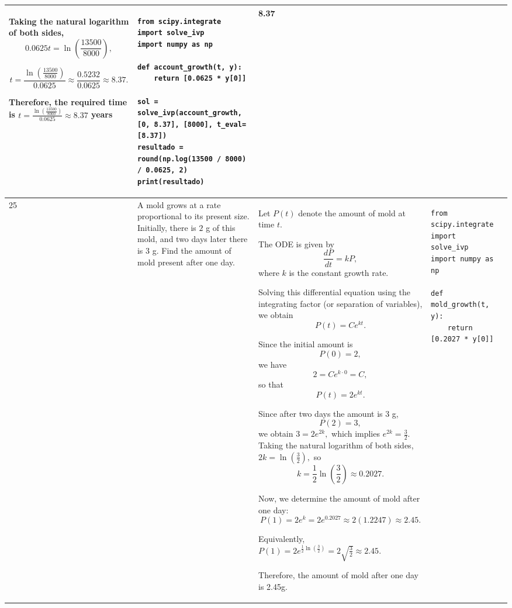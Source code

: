 \documentclass[a4paper,12pt]{article}
\begin{document}
\begin{longtable}{|p{0.3cm}|p{}|p{10cm}|p{}|p{1.5cm}|}
Taking the natural logarithm of both sides,
\[
0.0625t=\ln\left(\frac{13500}{8000}\right),
\]

\[
t=\frac{\ln\left(\frac{13500}{8000}\right)}{0.0625}
  \approx\frac{0.5232}{0.0625}
  \approx8.37.
\]

Therefore, the required time is
$ t=\frac{\ln\left(\frac{13500}{8000}\right)}{0.0625}\approx8.37$ years
& \begin{verbatim}
from scipy.integrate import solve_ivp
import numpy as np

def account_growth(t, y):
    return [0.0625 * y[0]]

sol = solve_ivp(account_growth, [0, 8.37], [8000], t_eval=[8.37])
resultado = round(np.log(13500 / 8000) / 0.0625, 2)
print(resultado) \end{verbatim}& 8.37   \\ \hline

25            &A mold grows at a rate proportional to its present size. Initially, there is \(2\) g of this mold, and two days later there is \(3\) g. Find the amount of mold present after one day.


              & Let \(P(t)\) denote the amount of mold at time \(t\).

The ODE is given by
\[
\frac{dP}{dt}=kP,
\]
where \(k\) is the constant growth rate.

Solving this differential equation using the integrating factor (or separation of variables), we obtain
\[
P(t)=Ce^{kt}.
\]

Since the initial amount is
\[
P(0)=2,
\]
we have
\[
2=Ce^{k\cdot0}=C,
\]
so that
\[
P(t)=2e^{kt}.
\]

Since after two days the amount is \(3\) g,
\[
P(2)=3,
\]
we obtain $3=2e^{2k},$
which implies $e^{2k}=\frac{3}{2}.$
Taking the natural logarithm of both sides,$2k=\ln\left(\frac{3}{2}\right),$
so
\[
k=\frac{1}{2}\ln\left(\frac{3}{2}\right)\approx0.2027.
\]

Now, we determine the amount of mold after one day:
\[
P(1)=2e^{k}
     =2e^{0.2027}
     \approx2(1.2247)
     \approx2.45.
\]

Equivalently,$P(1)
=2e^{\frac{1}{2}\ln\left(\frac{3}{2}\right)}
=2\sqrt{\frac{3}{2}}
\approx2.45.$

Therefore, the amount of mold after one day is 2.45g.
 & \begin{verbatim}
from scipy.integrate import solve_ivp
import numpy as np

def mold_growth(t, y):
    return [0.2027 * y[0]]


\end{verbatim}
\end{longtable}
\end{document}
